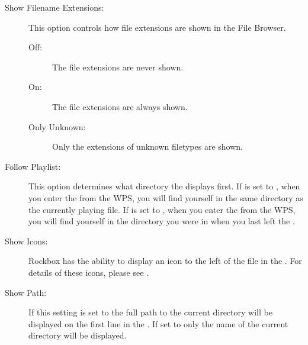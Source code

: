 \begin{description}
\item[\label{ref:ShowExtensions}Show Filename Extensions:]
  This option controls how file extensions are shown in the File Browser.
  \begin{description}
  \item[Off:] The file extensions are never shown.
  \item[On:] The file extensions are always shown.
  \item[Only Unknown:] Only the extensions of unknown filetypes are shown.
  \end{description}
  
\item[Follow Playlist:] 
  This option determines what directory the  displays
  first. If  is set to , when you enter
  the  from the WPS, you will find yourself in the same
  directory as the currently playing file. If  is set
  to , when you enter the  from the WPS, you
  will find yourself in the directory you were in when you last left the
  .
  
\item[Show Icons:]
  Rockbox has the ability to display an icon to the left of the file
  in the . For details of these icons, please see
  .

\item[Show Path:]
  If this setting is set to  the full path to the current
  directory will be displayed on the first line in the .
  If set to  only the name of the current
  directory will be displayed.

\end{description}
